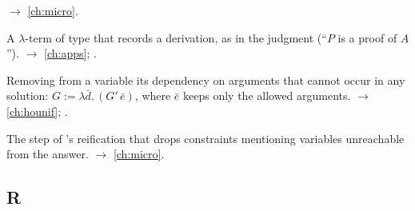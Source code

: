 \begin{glossarylist}
  $\rightarrow$ \cref{ch:micro}.
\item[Proof term] A $\lambda$-term of type  that records a derivation, as in the judgment 
  (\enquote{$P$ is a proof of $A$}). $\rightarrow$ \cref{ch:apps}; .
\item[Pruning] Removing from a variable its dependency on arguments that cannot occur in any solution:
  $G:=\lambda\bar d.\,(G'\,\bar e)$, where $\bar e$ keeps only the allowed arguments. $\rightarrow$
  \cref{ch:hounif}; .
\item[Purification] The step of \micro{}'s reification that drops constraints mentioning variables unreachable from
  the answer. $\rightarrow$ \cref{ch:micro}.
\end{glossarylist}

\subsection*{R}
